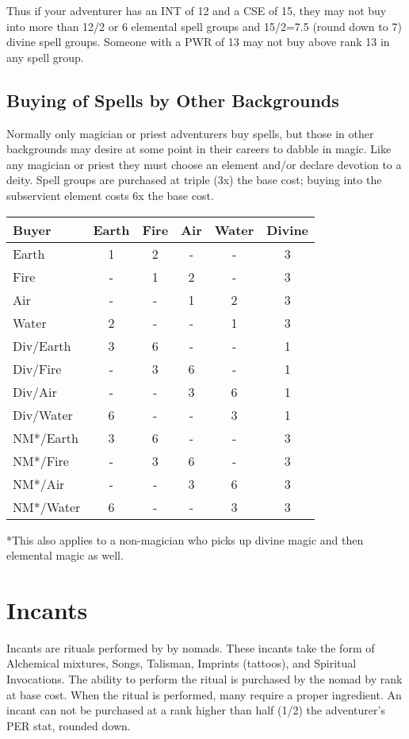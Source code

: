 Thus if your adventurer has an INT of 12 and a CSE of 15, they may not buy into more than 12/2 or 6 elemental spell groups and 15/2=7.5 (round down to 7) divine spell groups. Someone with a PWR of 13 may not buy above rank 13 in any spell group. 
\subsection{Buying of Spells by Other Backgrounds}
Normally only magician or priest adventurers buy spells, but those in other backgrounds may desire at some point in their careers to dabble in magic. Like any magician or priest they must choose an element and/or declare devotion to a deity. Spell groups are purchased at triple (3x) the base cost; buying into the subservient element costs 6x the base cost.

\begin{normbox}

\small
\begin{tabular}{@{}l c c c c c}
\textbf{Buyer} & \textbf{Earth}  & \textbf{Fire} & \textbf{Air} & \textbf{Water}  & \textbf{Divine}\\
\midrule
Earth & 1 & 2 & - & - & 3\\
Fire & - & 1 & 2 & - & 3\\
Air & - & - & 1 & 2 & 3\\
Water & 2 & - & - & 1 & 3\\
Div/Earth & 3 & 6 & - & - & 1\\
Div/Fire & - & 3 & 6 & - & 1\\
Div/Air & - & - & 3 & 6 & 1\\
Div/Water & 6 & - & - & 3 & 1\\
NM*/Earth & 3 & 6 & - & - & 3\\
NM*/Fire & - & 3 & 6 & - & 3\\
NM*/Air & - & - & 3 & 6 & 3\\
NM*/Water & 6 & - & - & 3 & 3\\
\end{tabular}
\end{normbox}

*This also applies to a non-magician who picks up divine magic and then elemental magic as well.
\section{Incants}
Incants are rituals performed by by nomads. These
incants take the form of Alchemical mixtures, Songs, Talisman, Imprints (tattoos), and Spiritual Invocations. The ability to perform the ritual is purchased by the nomad by rank at base cost. When the ritual is performed, many require a proper ingredient. An incant can not be purchased at a rank higher than half (1/2) the adventurer's PER stat, rounded down.
